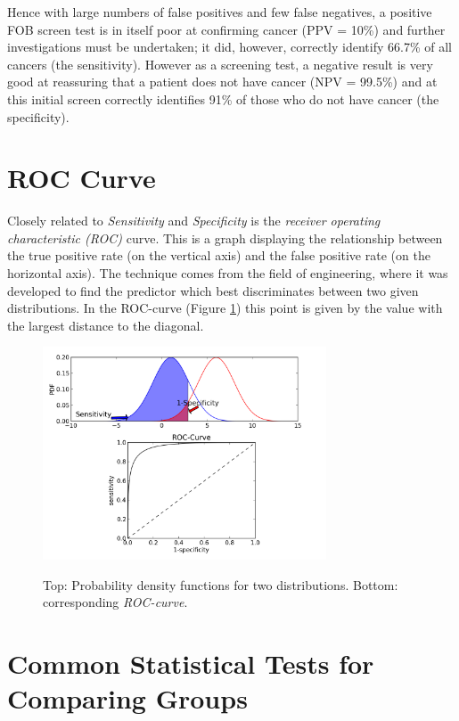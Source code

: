 Hence with large numbers of false positives and few false negatives, a positive FOB screen test is in itself poor at confirming cancer (PPV = 10\%) and further investigations must be undertaken; it did, however, correctly identify 66.7\% of all cancers (the sensitivity). However as a screening test, a negative result is very good at reassuring that a patient does not have cancer (NPV = 99.5\%) and at this initial screen correctly identifies 91\% of those who do not have cancer (the specificity).

\section{ROC Curve}

Closely related to \emph{Sensitivity} and \emph{Specificity} is the \emph{receiver operating characteristic (ROC)} curve. This is a graph displaying the relationship between the true positive rate (on the vertical axis) and the false positive rate (on the horizontal axis). The technique comes from the field of engineering, where it was developed to find the predictor which best discriminates between two given distributions. In the ROC-curve (Figure \ref{fig:ROC}) this point is given by the value with the largest distance to the diagonal.

\begin{figure}[ht]
  \centering
  \includegraphics[width=0.75\textwidth]{../Images/ROC.png}\\
  \caption{Top: Probability density functions for two distributions. Bottom: corresponding \emph{ROC-curve}.}\label{fig:ROC}
\end{figure}

\section{Common Statistical Tests for Comparing Groups}

